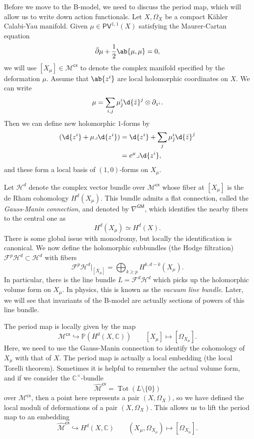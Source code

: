 \documentclass[article,10pt,oneside,oldfontcommands]{memoir}
\theoremstyle{definition}
\theoremstyle{remark}
\theoremstyle{plain}
\theoremstyle{definition}
\theoremstyle{remark}
\newcommand{\C}{\mathbb{C}}
\renewcommand{\P}{\mathbb{P}}
\newcommand{\mc}[1]{\mathcal{#1}}
\newcommand{\on}[1]{\operatorname{#1}}
\newcommand{\ms}[1]{\mathsf{#1}}
\newcommand{\1}{\mathbf{1}}
\newcommand{\2}{\mathbf{2}}
\newcommand{\3}{\mathbf{3}}
\newcommand{\dbar}{\bar{\partial}}
\begin{document}
Before we move to the B-model, we need to discuss the period map, which will allow us to write down action functionals. Let \(X, \Omega_X\) be a compact Kähler Calabi-Yau manifold. Given \(\mu \in \ms{PV}^{1,1}(X)\) satisfying the Maurer-Cartan equation
\[ \dbar \mu + \frac{1}{2} \ab\{\mu, \mu\} = 0, \]
we will use \([X_{\mu}] \in \mc{M}^{\ms{cx}}\) to denote the complex manifold specified by the deformation \(\mu\). Assume that \(\ab\{z^i\}\) are local holomorphic coordinates on \(X\). We can write
\[ \mu = \sum_{i,j} \mu_{\bar{\jmath}}^i \d{\bar{z}}^j \otimes \partial_{z^i}. \]
Then we can define new holomorphic \(1\)-forms by
\begin{align*}
    (\d{z^i} + \mu \lrcorner \d{z^i}) &= \d{z^i} + \sum_j \mu_{\bar{\jmath}}^i \d{\bar{z}}^j \\
    &= e^{\mu} \lrcorner \d{z^i},
\end{align*}
and these form a local basis of \((1,0)\)-forms on \(X_{\mu}\). 

Let \(\mc{H}^d\) denote the complex vector bundle over \(\mc{M}^{\ms{cx}}\) whose fiber at \([X_{\mu}]\) is the de Rham cohomology \(H^d(X_{\mu})\). This bundle admits a flat connection, called the \textit{Gauss-Manin connection}, and denoted by \(\nabla^{\ms{GM}}\), which identifies the nearby fibers to the central one as
\[ H^d (X_{\mu}) \simeq H^d(X). \]
There is some global issue with monodromy, but locally the identification is canonical. We now define the holomorphic subbundles (the Hodge filtration)
\(\mc{F}^p \mc{H}^d \subset \mc{H}^d\) with fibers
\[ \mc{F}^p \mc{H}^d|_{[X_{\mu}]} = \bigoplus_{k \geq p} H^{k, d-k}(X_{\mu}). \]
In particular, there is the line bundle \(L = \mc{F}^d \mc{H}^d\) which picks up the holomorphic volume form on \(X_{\mu}\). In physics, this is known as the \textit{vacuum line bundle}. Later, we will see that invariants of the B-model are actually sections of powers of this line bundle.

The period map is locally given by the map
\[ \mc{M}^{\ms{cx}} \hookrightarrow \P (H^d (X, \C)) \qquad [X_{\mu}] \mapsto [\Omega_{X_{\mu}}]. \]
Here, we need to use the Gauss-Manin connection to identify the cohomology of \(X_{\mu}\) with that of \(X\). The period map is actually a local embedding (the local Torelli theorem). Sometimes it is helpful to remember the actual volume form, and if we consider the \(\C^{\times}\)-bundle 
\[ \hat{\mc{M}}^{\ms{cx}} = \on{Tot}(L \setminus \{0\}) \]
over \(\mc{M}^{\ms{cx}}\), then a point here represents a pair \((X, \Omega_X)\), so we have defined the local moduli of deformations of a pair \((X, \Omega_X)\). This allows us to lift the period map to an embedding
\[ \hat{\mc{M}}^{\ms{cx}} \hookrightarrow H^d(X, \C) \qquad (X_{\mu}, \Omega_{X_{\mu}}) \mapsto [\Omega_{X_{\mu}}]. \]
\end{document}

